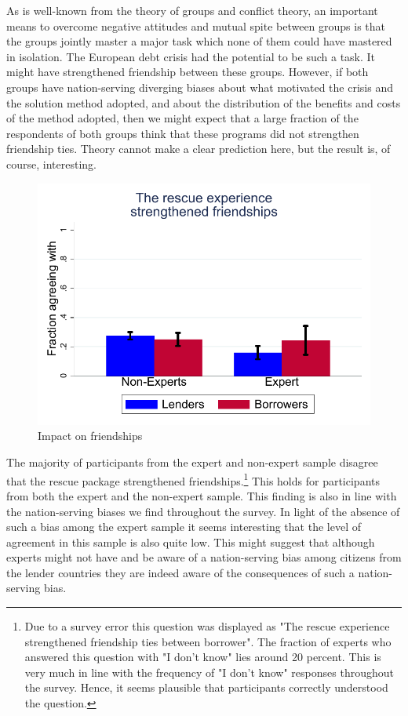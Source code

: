 As is well-known from the theory of groups and conflict theory, an important
means to overcome negative attitudes and mutual spite between groups is that
the groups jointly master a major task which none of them could have
mastered in isolation. The European debt crisis had the potential to be 
such a task. It might have strengthened friendship between these groups.
However, if both groups have nation-serving diverging biases about what
motivated the crisis and the solution method adopted, and about the
distribution of the benefits and costs of the method adopted, then we might
expect that a large fraction of the respondents of both groups think that
these programs did not strengthen friendship ties. Theory cannot make a
clear prediction here, but the result is, of course, interesting.
\begin{figure}
\centering
\caption{Impact on friendships}
\includegraphics[scale=0.5]{graph5_3.pdf}
\end{figure}

The majority of participants from the expert and non-expert sample disagree that 
the rescue package strengthened friendships.\footnote{Due to a survey error this question was displayed as "The rescue experience strengthened friendship ties between borrower". The fraction of experts who answered this question with "I don't know" lies around 20 percent. This is very much in line with the frequency of "I don't know" responses throughout the survey. Hence, it seems plausible that participants correctly understood the question. } This holds for participants from 
both the expert and the non-expert sample. This finding is also in line with the nation-serving biases
we find throughout the survey. In light of the absence of such a bias among the expert sample 
it seems interesting that the level of agreement in this sample is also quite low. 
This might suggest that although experts might not have and be aware of a nation-serving bias
among citizens from the lender countries they are indeed aware of the consequences of such 
a nation-serving bias. 
\\

